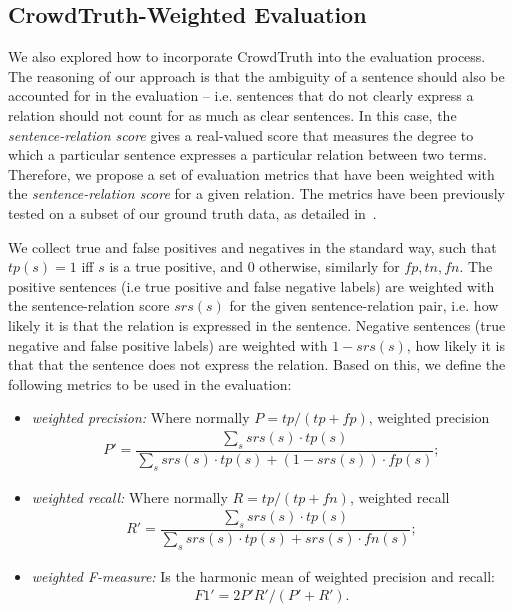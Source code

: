 \subsection{CrowdTruth-Weighted Evaluation}

We also explored how to incorporate CrowdTruth into the evaluation process. The reasoning of our approach is that the ambiguity of a sentence should also be accounted for in the evaluation -- i.e. sentences that do not clearly express a relation should not count for as much as clear sentences. In this case, the \textit{sentence-relation score} gives a real-valued score that measures the degree to which a particular sentence expresses a particular relation between two terms. Therefore, we propose a set of evaluation metrics that have been weighted with the \textit{sentence-relation score} for a given relation. The metrics have been previously tested on a subset of our ground truth data, as detailed in~\cite{dumitrache2015a}.

We collect true and false positives and negatives in the standard way, such that $tp(s) = 1 $ iff $s$ is a true positive, and $0$ otherwise, similarly for $fp, tn, fn$. The positive sentences (i.e true positive and false negative labels) are weighted with the sentence-relation score $srs(s)$ for the given sentence-relation pair, i.e. how likely it is that the relation is expressed in the sentence. Negative sentences (true negative and false positive labels) are weighted with $1 - srs(s)$, how likely it is that that the sentence does not express the relation. Based on this, we define the following metrics to be used in the evaluation: 
 

\begin{itemize}

\item \textit{weighted precision:}   Where normally $P = tp/(tp + fp)$, weighted precision 
\begin{align}
    P' = \dfrac{\sum_{s}{srs(s) \cdot tp(s)}} {\sum_{s}{srs(s) \cdot tp(s) + (1 - srs(s)) \cdot fp(s)}};
\end{align}

\item \textit{weighted recall:} Where normally $R = tp/(tp + fn)$, weighted recall
\begin{align}
R' = \dfrac{\sum_{s}{srs(s) \cdot tp(s)}}{\sum_{s}{srs(s) \cdot tp(s) + srs(s) \cdot fn(s)}};
\end{align}

\item \textit{weighted F-measure:} Is the harmonic mean of weighted precision and recall: 
\begin{align}
F1' = 2 P' R' / (P' + R').
\end{align}

\end{itemize}


